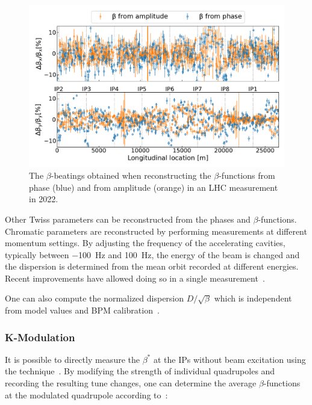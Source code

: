 \begin{figure}[!htb]
  \centering
  \includegraphics*[width=0.99\linewidth]{Figures/Optics_Measurements_Corrections_at_LHC/betabeat_phase_vs_amp.pdf}
  \caption{The \(\beta\)-beatings obtained when reconstructing the \(\beta\)-functions from phase (\textcolor{mplblue}{blue}) and from amplitude (\textcolor{mplorange}{orange}) in an LHC measurement in \num{2022}.}
  \label{figure:betabeating_phase_vs_amp}
\end{figure}

Other Twiss parameters can be reconstructed from the phases and \(\beta\)-functions.
Chromatic parameters are reconstructed by performing measurements at different momentum settings.
By adjusting the frequency of the accelerating cavities, typically between \qty{-100}{\hertz} and \qty{+100}{\hertz}, the energy of the beam is changed and the dispersion is determined from the mean orbit recorded at different energies.
Recent improvements have allowed doing so in a single measurement~\cite{PHD:Malina, IPAC:Malina:3D_Excitation}.

One can also compute the normalized dispersion \(D / \sqrt{\beta}\) which is independent from model values and BPM calibration~\cite{PAC:Calaga:BPM_Calibration_Independent_LHC_Optics_Correction}.

\subsubsection*{K-Modulation}

It is possible to directly measure the \(\beta^{\ast}\) at the IPs without beam excitation using the  technique~\cite{IPAC:Calaga:LHC_K_Modulation}.
By modifying the strength of individual quadrupoles and recording the resulting tune changes, one can determine the average \(\beta\)-functions at the modulated quadrupole according to~\cite{BOOK:Minty:Measurements_Control_Charged_Particle_Beams}:

